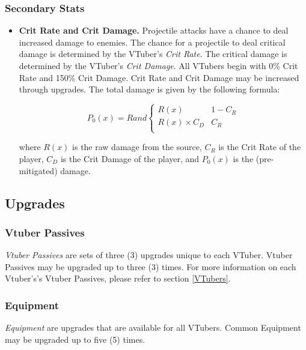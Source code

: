 \documentclass[10pt, a4paper]{article}
\begin{document}
  	\subsubsection{Secondary Stats}
  	
  	\begin{itemize}
  	 \item \textbf{Crit Rate and Crit Damage.} Projectile attacks have a chance to deal increased damage to enemies. The chance for a projectile to deal critical damage is determined by the VTuber's \textit{Crit Rate}. The critical damage is determined by the VTuber's \textit{Crit Damage}. All VTubers begin with 0\% Crit Rate and 150\% Crit Damage. Crit Rate and Crit Damage may be increased through upgrades. The total damage is given by the following formula:

  	 \[
	  	 P_0(x) = Rand\begin{cases}
	  	 	R(x) & 1 - C_R\\
	  	 	R(x) \times C_D & C_R \\
	  	 \end{cases}
  	 \]
  	 
  	 where $R(x)$ is the raw damage from the source, $C_R$ is the Crit Rate of the player, $C_D$ is the Crit Damage of the player, and $P_0(x)$ is the (pre-mitigated) damage.
  	 
  	\end{itemize}
  	
  	\subsection{Upgrades} \label{Upgrades}
	
  	\subsubsection{Vtuber Passives}
  	
  	\textit{Vtuber Passives} are sets of three (3) upgrades unique to each VTuber. Vtuber Passives may be upgraded up to three (3) times. For more information on each Vtuber's's Vtuber Passives, please refer to section \ref{VTubers}.
  	
  	\subsubsection{Equipment}
  	
  	\textit{Equipment} are upgrades that are available for all VTubers. Common Equipment may be upgraded up to five (5) times.
  	
\end{document}
